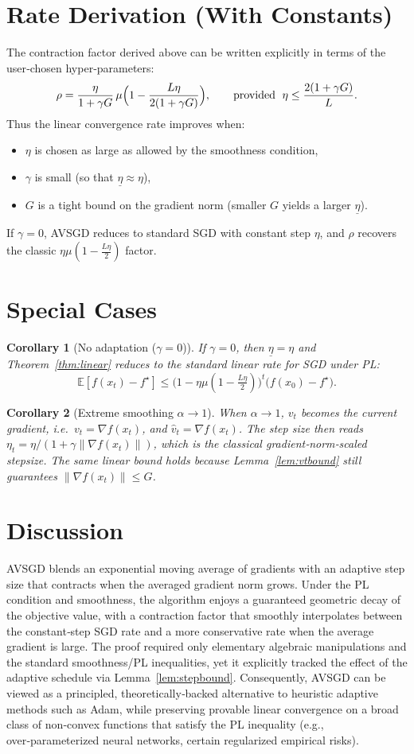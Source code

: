 \documentclass{article}
\newtheorem{corollary}{Corollary}
\newcommand{\norm}[1]{\left\lVert #1 \right\rVert}
\begin{document}
\section*{Rate Derivation (With Constants)}
The contraction factor derived above can be written explicitly in terms of the user‑chosen hyper‑parameters:
\[
\rho
= \frac{\eta}{1+\gamma G}\,
   \mu\Bigl(1-\frac{L\eta}{2(1+\gamma G)}\Bigr),
\qquad
\text{provided }\;
\eta\le\frac{2(1+\gamma G)}{L}.
\]
Thus the linear convergence rate improves when:
\begin{itemize}
\item $\eta$ is chosen as large as allowed by the smoothness condition,
\item $\gamma$ is small (so that $\underline{\eta}\approx\eta$),
\item $G$ is a tight bound on the gradient norm (smaller $G$ yields a larger $\underline{\eta}$).
\end{itemize}
If $\gamma=0$, AVSGD reduces to standard SGD with constant step $\eta$, and $\rho$ recovers the classic $\eta\mu(1-\frac{L\eta}{2})$ factor.

\section*{Special Cases}
\begin{corollary}[No adaptation ($\gamma=0$)]
If $\gamma=0$, then $\underline{\eta}=\eta$ and Theorem~\ref{thm:linear} reduces to the standard linear rate for SGD under PL:
\[
\mathbb{E}[f(x_{t})-f^{\star}]\le
\bigl(1-\eta\mu(1-\tfrac{L\eta}{2})\bigr)^{t}\bigl(f(x_{0})-f^{\star}\bigr).
\]
\end{corollary}
\begin{corollary}[Extreme smoothing $\alpha\to1$]
When $\alpha\to1$, $v_{t}$ becomes the current gradient, i.e.\ $v_{t}= \nabla f(x_{t})$, and $\hat v_{t}= \nabla f(x_{t})$. The step size then reads $\eta_{t}= \eta/(1+\gamma\norm{\nabla f(x_{t})})$, which is the classical gradient‑norm‑scaled stepsize. The same linear bound holds because Lemma~\ref{lem:vtbound} still guarantees $\norm{\nabla f(x_{t})}\le G$.
\end{corollary}

\section*{Discussion}
AVSGD blends an exponential moving average of gradients with an adaptive step size that contracts when the averaged gradient norm grows. Under the PL condition and smoothness, the algorithm enjoys a guaranteed geometric decay of the objective value, with a contraction factor that smoothly interpolates between the constant‑step SGD rate and a more conservative rate when the average gradient is large. The proof required only elementary algebraic manipulations and the standard smoothness/PL inequalities, yet it explicitly tracked the effect of the adaptive schedule via Lemma~\ref{lem:stepbound}. Consequently, AVSGD can be viewed as a principled, theoretically‑backed alternative to heuristic adaptive methods such as Adam, while preserving provable linear convergence on a broad class of non‑convex functions that satisfy the PL inequality (e.g., over‑parameterized neural networks, certain regularized empirical risks).
\end{document}
